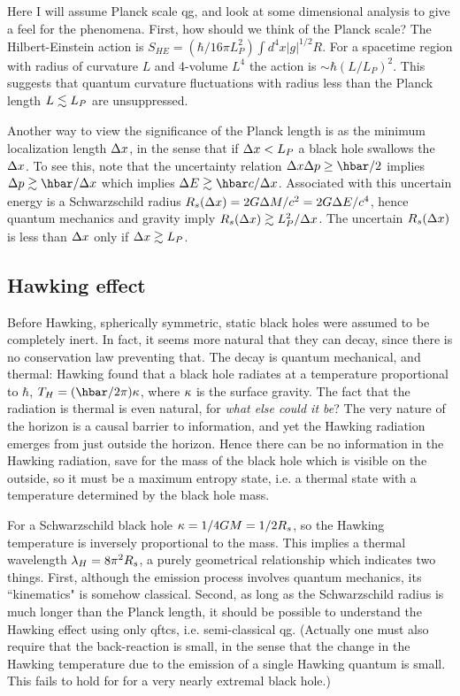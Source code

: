 \documentclass[12pt]{article}
\begin{document}
Here I will assume Planck scale qg, and look at some dimensional
analysis to give a feel for the phenomena.
First, how should we think of the Planck scale? The
Hilbert-Einstein action is 
$S_{HE}=(\hbar/16\pi L_P^{2})\int d^4x |g|^{1/2}R$.
For a spacetime region with radius of 
curvature $L$ and 4-volume $L^4$  
the action is $\sim\hbar (L/L_P)^2$. This suggests that
quantum curvature fluctuations with radius 
less than the Planck length $L\lsim L_P$ 
are unsuppressed. 

Another way to view the significance of the Planck length is 
as the minimum localization length $\Delta x$, in the sense
that if $\Delta x<L_P$ a black hole swallows the $\Delta x$.
To see this, note that the uncertainty relation 
$\D x\D p\ge\hbar/2$ implies
$\D p\gsim \hbar/\D x$ which implies $\D E\gsim \hbar c/\D x$.
Associated with this uncertain energy is a Schwarzschild radius
$R_s(\Delta x)=2G\Delta M/c^2=2G\Delta E/c^4$,
hence quantum mechanics and gravity imply 
$R_s(\D x)\gsim L_P^2/\D x$. The uncertain $R_s(\Delta x)$ is 
less than $\Delta x$ only if $\D x\gsim L_P$.

\subsection{Hawking effect}
\label{hawkintro}

Before Hawking, spherically symmetric, static 
black holes were assumed
to be completely inert. In fact, it seems more natural that
they can decay, since there is no conservation law preventing
that. The decay is quantum mechanical, and thermal:  Hawking
found that a black hole radiates at a temperature
proportional to $\hbar$, $T_H=(\hbar/2\pi)\k$, where $\kappa$ is the
surface gravity. The fact that the radiation is thermal is
even natural, for {\it what else could it be}? The very nature of the
horizon is a causal barrier to information, and yet the Hawking
radiation emerges from just outside the horizon. Hence there can be 
no information in the Hawking radiation, save for the mass of the
black hole which is visible on the outside, so it must be a maximum
entropy state, i.e. a thermal state with a temperature determined by the 
black hole mass. 

For a Schwarzschild
black hole $\kappa=1/4GM=1/2R_s$, so the Hawking temperature is 
inversely proportional to the mass. 
This implies a thermal wavelength
$\lambda_H=8\pi^2 R_s$, a purely geometrical relationship
which indicates two things. First, although the emission
process involves quantum mechanics, its ``kinematics"
is somehow classical. Second,  as long as the Schwarzschild
radius is much longer than the Planck length,  it should
be possible to understand the Hawking effect using
only qftcs, i.e. semi-classical qg. 
(Actually one must also require that the back-reaction
is small, in the sense that the change in the Hawking temperature
due to the emission of a single Hawking quantum is small. 
This fails to hold for for a very nearly extremal black hole\cite{Preskill:1991tb}.)
\end{document}
